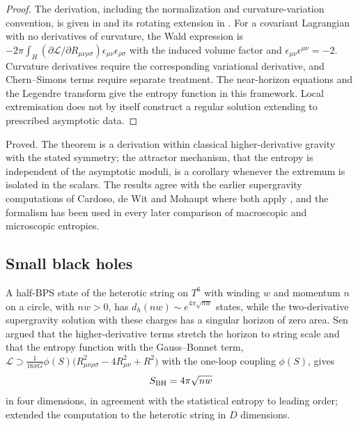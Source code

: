 \begin{proof}
The derivation, including the normalization and curvature-variation convention, is given in \cite[Section~2]{Sen05entropy} and its rotating extension in \cite{AGJST06}. For a covariant Lagrangian with no derivatives of curvature, the Wald expression is $-2\pi\int_H (\partial\mathcal L/\partial R_{\mu\nu\rho\sigma})\epsilon_{\mu\nu}\epsilon_{\rho\sigma}$ with the induced volume factor and $\epsilon_{\mu\nu}\epsilon^{\mu\nu}=-2$. Curvature derivatives require the corresponding variational derivative, and Chern--Simons terms require separate treatment. The near-horizon equations and the Legendre transform give the entropy function in this framework. Local extremisation does not by itself construct a regular solution extending to prescribed asymptotic data.
\end{proof}

\begin{verdict}[claims 24, 25]
Proved. The theorem is a derivation within classical higher-derivative gravity with the stated symmetry; the attractor mechanism, that the entropy is independent of the asymptotic moduli, is a corollary whenever the extremum is isolated in the scalars. The results agree with the earlier supergravity computations of Cardoso, de Wit and Mohaupt where both apply \cite{Sen05entropy}, and the formalism has been used in every later comparison of macroscopic and microscopic entropies.
\end{verdict}

\subsection{Small black holes}\label{ssec:small}

A half-BPS state of the heterotic string on $T^6$ with winding $w$ and momentum $n$ on a circle, with $nw>0$, has $d_h(nw)\sim e^{4\pi\sqrt{nw}}$ states, while the two-derivative supergravity solution with these charges has a singular horizon of zero area. Sen \cite{Sen04stretch} argued that the higher-derivative terms stretch the horizon to string scale and that the entropy function with the Gauss--Bonnet term, $\mathcal L \supset \frac{1}{16\pi G}\phi(S)\big(R_{\mu\nu\rho\sigma}^2 - 4R_{\mu\nu}^2 + R^2\big)$ with the one-loop coupling $\phi(S)$, gives
\begin{equation}\label{eq:small}
S_{\rm BH} = 4\pi\sqrt{nw}
\end{equation}
in four dimensions, in agreement with the statistical entropy to leading order; \cite{Sen05stretching} extended the computation to the heterotic string in $D$ dimensions.

